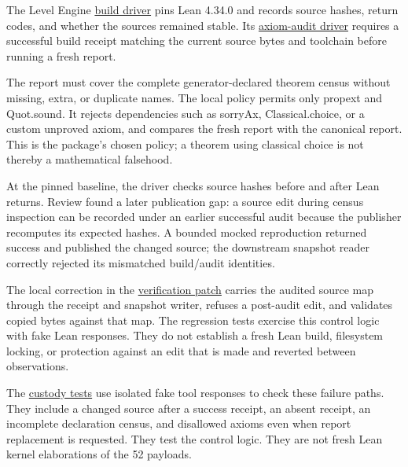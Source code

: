 \documentclass[
  11pt,
]{article}
\begin{document}
The Level Engine
\href{https://github.com/dbccpage/the_symbol_game/blob/52cb5457f6c485ba548cfd292f6012a941ed22cf/omega_engine_operations/use_cases/level_engine/lean_build.py}{build
driver} pins Lean 4.34.0 and records source hashes, return codes, and
whether the sources remained stable. Its
\href{https://github.com/dbccpage/the_symbol_game/blob/52cb5457f6c485ba548cfd292f6012a941ed22cf/omega_engine_operations/use_cases/level_engine/lean_audit.py}{axiom-audit
driver} requires a successful build receipt matching the current source
bytes and toolchain before running a fresh report.

The report must cover the complete generator-declared theorem census
without missing, extra, or duplicate names. The local policy permits
only propext and Quot.sound. It rejects dependencies such as sorryAx,
Classical.choice, or a custom unproved axiom, and compares the fresh
report with the canonical report. This is the package's chosen policy; a
theorem using classical choice is not thereby a mathematical falsehood.

At the pinned baseline, the driver checks source hashes before and after
Lean returns. Review found a later publication gap: a source edit during
census inspection can be recorded under an earlier successful audit
because the publisher recomputes its expected hashes. A bounded mocked
reproduction returned success and published the changed source; the
downstream snapshot reader correctly rejected its mismatched build/audit
identities.

The local correction in the
\href{https://github.com/dbccpage/the_symbol_game/blob/23893fc44162555fa12ceda3e1665982e3d7a14e/omega_engine_atlas/coda_atlas/omega_engine_symbol_game/verification/source_delta.patch}{verification
patch} carries the audited source map through the receipt and snapshot
writer, refuses a post-audit edit, and validates copied bytes against
that map. The regression tests exercise this control logic with fake
Lean responses. They do not establish a fresh Lean build, filesystem
locking, or protection against an edit that is made and reverted between
observations.

The
\href{https://github.com/dbccpage/the_symbol_game/blob/52cb5457f6c485ba548cfd292f6012a941ed22cf/omega_engine_operations/tests/level_engine/test_lean.py}{custody
tests} use isolated fake tool responses to check these failure paths.
They include a changed source after a success receipt, an absent
receipt, an incomplete declaration census, and disallowed axioms even
when report replacement is requested. They test the control logic. They
are not fresh Lean kernel elaborations of the 52 payloads.
\end{document}
